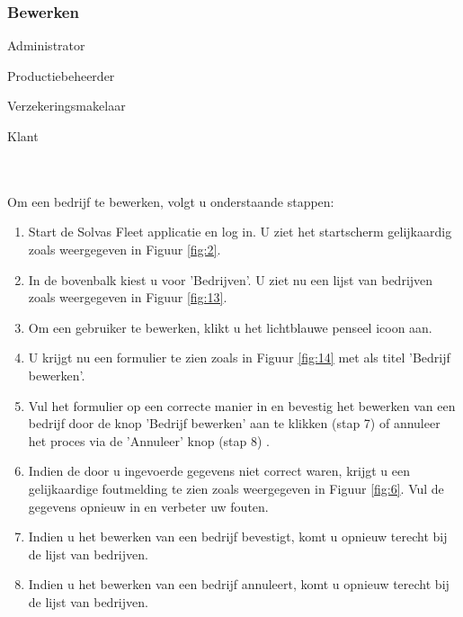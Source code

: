 \documentclass[11pt,openany]{article}
\newcommand{\cmark}{\ding{51}}%
\newcommand{\xmark}{\ding{55}}%
\newcommand{\done}{\rlap{$\square$}{\raisebox{2pt}{\large\hspace{1pt}\cmark}}%
	\hspace{-2.5pt}}
\newcommand{\wontfix}{\rlap{$\square$}{\large\hspace{1pt}\xmark}}
\begin{document}
\subsubsection{Bewerken}
\label{company_edit}
\begin{todolist}
	\item[\done] Administrator
	\item[\done] Productiebeheerder
	\item[\done] Verzekeringsmakelaar
	\item[\wontfix] Klant 
\end{todolist}
\\
\\
Om een bedrijf te bewerken, volgt u onderstaande stappen:
\begin{enumerate}
	\item Start de Solvas Fleet applicatie en log in. U ziet het startscherm gelijkaardig zoals weergegeven in Figuur \ref{fig:2}.
	\item In de bovenbalk kiest u voor 'Bedrijven'. U ziet nu een lijst van bedrijven zoals weergegeven in Figuur \ref{fig:13}.
	\item Om een gebruiker te bewerken, klikt u het lichtblauwe penseel icoon aan.
	\item U krijgt nu een formulier te zien zoals in Figuur \ref{fig:14} met als titel 'Bedrijf bewerken'.
	\item Vul het formulier op een correcte manier in en bevestig het bewerken van een bedrijf door de knop 'Bedrijf bewerken' aan te klikken (stap 7) of annuleer het proces via de 'Annuleer' knop (stap 8) .
	\item Indien de door u ingevoerde gegevens niet correct waren, krijgt u een gelijkaardige foutmelding te zien zoals weergegeven in Figuur \ref{fig:6}. Vul de gegevens opnieuw in en verbeter uw fouten.
	\item Indien u het bewerken van een bedrijf bevestigt, komt u opnieuw terecht bij de lijst van bedrijven. 
	\item Indien u het bewerken van een bedrijf annuleert, komt u opnieuw terecht bij de lijst van bedrijven.
	
\end{enumerate}
\end{document}
